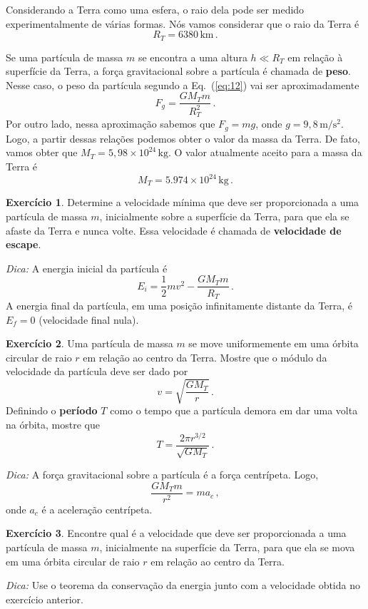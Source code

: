 \documentclass[twocolumn=on,fontsize=12pt,DIV=calc]{scrartcl}
\theoremstyle{definition}
\newtheorem{ex}{Exercício}[section]
\begin{document}
Considerando a Terra como uma esfera, o raio dela pode ser medido
experimentalmente de várias formas. Nós vamos considerar que o raio da
Terra é
$$R_T=6380\,\mathrm{km}\,.$$

Se uma partícula de massa $m$ se encontra a uma altura $h\ll R_T$ em
relação à superfície da Terra, a força gravitacional sobre a partícula
é chamada de \textbf{peso}. Nesse caso, o peso da partícula segundo a
Eq.~(\ref{eq:12}) vai ser aproximadamente
$$F_g=\frac{GM_Tm}{R_T^2}\,.$$
Por outro lado, nessa aproximação sabemos que $F_g=mg$, onde
$g=9{,}8\,\mathrm{m}/\mathrm{s}^2$. Logo, a partir dessas relações
podemos obter o valor da massa da Terra. De fato, vamos obter que
$M_T=5{,}98\times 10^{24}\,\mathrm{kg}$. O valor atualmente aceito
para a massa da Terra é
$$M_T=5.974\times 10^{24}\,\mathrm{kg}\,.$$

\begin{ex}
  Determine a velocidade mí\-ni\-ma que deve ser proporcionada a uma
  partícula de massa $m$, inicialmente sobre a superfície da Terra,
  para que ela se afaste da Terra e nunca volte. Essa velocidade é
  chamada de \textbf{velocidade de escape}.

  \noindent\textit{Dica:} A energia inicial da partícula é
  $$E_i=\frac{1}{2}mv^2-\frac{GM_Tm}{R_T}\,.$$
  A energia final da partícula, em uma posição infinitamente distante
  da Terra, é $E_f=0$ (velocidade final nula).
\end{ex}

\begin{ex}
  Uma partícula de massa $m$ se move uniformemente em uma órbita
  circular de raio $r$ em relação ao centro da Terra. Mostre que o
  módulo da velocidade da partícula deve ser dado por
  $$v=\sqrt{\frac{GM_T}{r}}\,.$$
  Definindo o \textbf{período} $T$ como o tempo que a partícula demora
  em dar uma volta na órbita, mostre que
  $$T=\frac{2\pi r^{3/2}}{\sqrt{GM_T}}\,.$$

  \noindent\textit{Dica:} A força gravitacional sobre a partícula é a
  força centrípeta. Logo,
  $$\frac{GM_Tm}{r^2}=ma_c\,,$$
  onde $a_c$ é a aceleração centrípeta.
\end{ex}

\begin{ex}
  Encontre qual é a velocidade que deve ser proporcionada a uma
  partícula de massa $m$, inicialmente na superfície da Terra, para
  que ela se mova em uma órbita circular de raio $r$ em relação ao
  centro da Terra.

  \noindent\textit{Dica:} Use o teorema da conservação da energia
  junto com a velocidade obtida no exercício anterior.
\end{ex}
\end{document}
